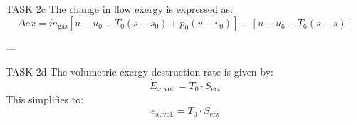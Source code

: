 TASK 2c  
The change in flow exergy is expressed as:  
\[
\Delta ex = \dot{m}_{\text{gas}} \left[ u - u_0 - T_0 (s - s_0) + p_0 (v - v_0) \right] - \left[ u - u_6 - T_6 (s - s) \right]
\]

---

TASK 2d  
The volumetric exergy destruction rate is given by:  
\[
\dot{E}_{x,\text{vol.}} = T_0 \cdot \dot{S}_{\text{erz}}
\]  
This simplifies to:  
\[
e_{x,\text{vol.}} = T_0 \cdot S_{\text{erz}}
\]